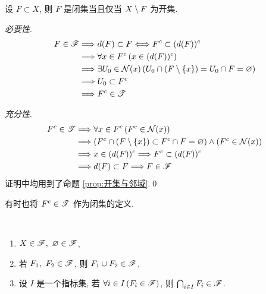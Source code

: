     \begin{Theorem}[开集与闭集的对偶]
        设 $ F\subset X $, 则 $ F $ 是闭集当且仅当 $ X\setminus F $ 为开集. 
    \end{Theorem}
    \begin{Proof}
        \textsl{必要性}. 
        \begin{align*}
            F\in\mathscr{F} & \Longrightarrow d(F)\subset F\Longleftrightarrow F^{c}\subset (d(F))^{c}\\
            & \Longrightarrow \forall x\in F^{c}\,(x\in(d(F))^{c})\\
            & \Longrightarrow \exists U_{0}\in\mathcal{N}(x)\,(U_{0}\cap (F\setminus\left\{ x \right\})=U_{0}\cap F=\varnothing)\\
            & \Longrightarrow U_{0}\subset F^{c}\\
            & \Longrightarrow F^{c}\in\mathscr{T}
        \end{align*}

        \textsl{充分性}. 
        \begin{align*}
            F^{c}\in\mathscr{T} & \Longrightarrow \forall x\in F^{c}\,(F^{c}\in\mathcal{N}(x))\\
            & \Longrightarrow (F^{c}\cap(F\setminus\left\{ x \right\})\subset F^{c}\cap F=\varnothing)\land (F^{c}\in\mathcal{N}(x))\\
            & \Longrightarrow x\in(d(F))^{c}\Longrightarrow F^{c}\subset(d(F))^{c}\\
            & \Longrightarrow d(F)\subset F\Longrightarrow F\in \mathscr{F}
        \end{align*}
        证明中均用到了命题 \ref{prop:开集与邻域}.\qed
    \end{Proof}

    \begin{Remark}
        有时也将 $ F^{c}\in\mathscr{T} $ 作为闭集的定义.
    \end{Remark}

    \begin{Proposition}[闭集的性质]
        ~
        \begin{enumerate}[$ (\mathrm{F}_1) $, itemindent=2.5\parindent]
            \item $ X\in\SF,\ \varnothing\in\SF $,
            \item 若 $ F_{1},\ F_{2}\in\mathscr{F} $, 则 $ F_{1}\cup F_{2}\in\mathscr{F} $,
            \item 设 $ I $ 是一个指标集, 若 $ \forall i\in I\,(F_{i}\in\mathscr{F}) $, 则 $ \bigcap_{i\in I}F_{i}\in\mathscr{F} $.
        \end{enumerate}
    \end{Proposition}

